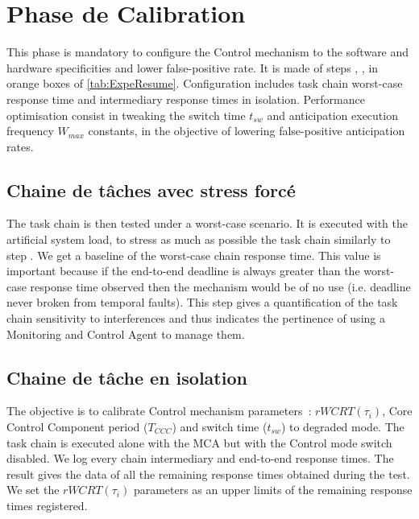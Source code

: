 \documentclass[french, a4paper, 11pt, twoside, pdftex]{StyleThese}
\begin{document}
                	
\section{Phase de Calibration}
            This phase is mandatory to configure the Control mechanism to the software and hardware specificities and lower false-positive rate. It is made of steps \circleTxt[4], \circleTxt[5], \circleTxt[6] in orange boxes of \autoref{tab:ExpeResume}. Configuration includes task chain worst-case response time and intermediary response times in isolation. Performance optimisation consist in tweaking the switch time $t_{sw}$ and anticipation execution frequency $W_{max}$ constants, in the objective of lowering false-positive anticipation rates.
            
    \subsection{Chaine de tâches avec stress forcé}
                    The task chain is then tested under a worst-case scenario. It is executed with the artificial system load, to stress as much as possible the task chain similarly to step \circleTxt[2]. We get a baseline of the worst-case chain response time. This value is important because if the end-to-end deadline is always greater than the worst-case response time observed then the mechanism would be of no use (i.e. deadline never broken from temporal faults). This step gives a quantification of the task chain sensitivity to interferences and thus indicates the pertinence of using a Monitoring and Control Agent to manage them.
                    
    \subsection{Chaine de tâche en isolation}
                    The objective is to calibrate Control mechanism parameters~: $rWCRT(\tau_i)$, Core Control Component period ($T_{CCC}$) and switch time ($t_{sw}$) to degraded mode. The task chain is executed alone with the MCA but with the Control mode switch disabled. We log every chain intermediary and end-to-end response times. The result gives the data of all the remaining response times obtained during the test. We set the $rWCRT(\tau_i)$ parameters as an upper limits of the remaining response times registered.
                    
\end{document}
